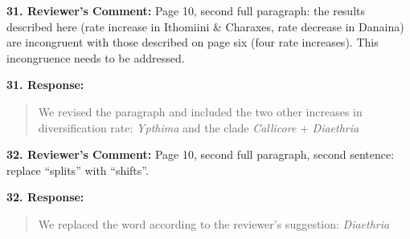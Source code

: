 \documentclass[]{article}
\begin{document}
\textbf{31. Reviewer's Comment:}
Page 10, second full paragraph: the results described here (rate increase in 
Ithomiini \& Charaxes, rate decrease in Danaina) are incongruent with those
described on page six (four rate increases). This incongruence needs to be 
addressed.

\textbf{31. Response:}
\begin{quote}
\color{blue}
We revised the paragraph and included the two other increases
in diversification rate: \emph{Ypthima} and the clade \emph{Callicore} + 
\emph{Diaethria}
\end{quote}


\textbf{32. Reviewer's Comment:}
Page 10, second full paragraph, second sentence: replace “splits” with “shifts”.

\textbf{32. Response:}
\begin{quote}
\color{blue}
We replaced the word according to the reviewer's suggestion:
\emph{Diaethria}
\end{quote}
\end{document}

